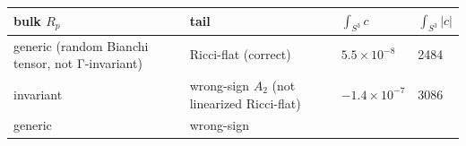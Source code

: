 \documentclass[
  10pt,
]{report}
\begin{document}
\begin{longtable}[]{@{}llll@{}}
\toprule
\begin{minipage}[b]{0.22\columnwidth}\raggedright
bulk \(R_p\)\strut
\end{minipage} & \begin{minipage}[b]{0.22\columnwidth}\raggedright
tail\strut
\end{minipage} & \begin{minipage}[b]{0.22\columnwidth}\raggedright
\(\int_{S^3}c\)\strut
\end{minipage} & \begin{minipage}[b]{0.22\columnwidth}\raggedright
\(\int_{S^3}|c|\)\strut
\end{minipage}\tabularnewline
\midrule
\endhead
\begin{minipage}[t]{0.22\columnwidth}\raggedright
generic (random Bianchi tensor, not Γ-invariant)\strut
\end{minipage} & \begin{minipage}[t]{0.22\columnwidth}\raggedright
Ricci-flat (correct)\strut
\end{minipage} & \begin{minipage}[t]{0.22\columnwidth}\raggedright
\(5.5\times10^{-8}\)\strut
\end{minipage} & \begin{minipage}[t]{0.22\columnwidth}\raggedright
2484\strut
\end{minipage}\tabularnewline
\begin{minipage}[t]{0.22\columnwidth}\raggedright
invariant\strut
\end{minipage} & \begin{minipage}[t]{0.22\columnwidth}\raggedright
wrong-sign \(A_2\) (not linearized Ricci-flat)\strut
\end{minipage} & \begin{minipage}[t]{0.22\columnwidth}\raggedright
\(-1.4\times10^{-7}\)\strut
\end{minipage} & \begin{minipage}[t]{0.22\columnwidth}\raggedright
3086\strut
\end{minipage}\tabularnewline
\begin{minipage}[t]{0.22\columnwidth}\raggedright
generic\strut
\end{minipage} & \begin{minipage}[t]{0.22\columnwidth}\raggedright
wrong-sign\strut
\end{minipage} & \begin{minipage}[t]{0.22\columnwidth}\raggedright

\end{minipage}
\end{longtable}
\end{document}
